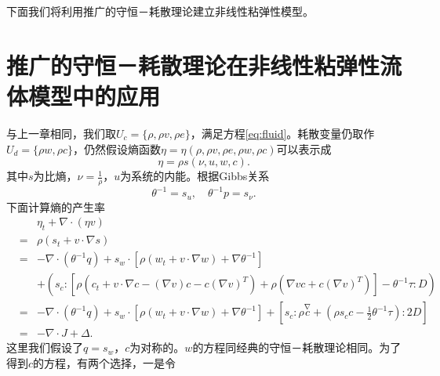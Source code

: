 

下面我们将利用推广的守恒－耗散理论建立非线性粘弹性模型。

\section{推广的守恒－耗散理论在非线性粘弹性流体模型中的应用}
与上一章相同，我们取$U_c = \{ \rho,\rho v,\rho e\}$，满足方程\eqref{eq:fluid}。耗散变量仍取作$U_d =\{\rho w, \rho c\}$，仍然假设熵函数$\eta =\eta(\rho,\rho v,\rho e,\rho w,\rho c)$可以表示成
\begin{equation*}
	\eta = \rho s(\nu,u,w,c).
\end{equation*}
其中$s$为比熵，$\nu = \frac{1}{\rho}$，$u$为系统的内能。根据Gibbs关系
\begin{equation*}
		\theta^{-1} = s_u, \quad \theta^{-1} p = s_{\nu}.
\end{equation*}
下面计算熵的产生率
\begin{eqnarray*}
		&&\eta_t + \nabla \cdot (\eta v) \\
		&=& \rho (s_t + v \cdot \nabla s) \\
		&=& -\nabla \cdot (\theta^{-1} q) + s_w \cdot [\rho (w_t + v \cdot \nabla w) + \nabla \theta^{-1}] \\
		&&+ (s_c:[\rho (c_t + v \cdot \nabla c - (\nabla v) c - c (\nabla v)^T) + \rho (\nabla v c + c (\nabla v)^T)] - \theta^{-1} \tau : D) \\
		&=& -\nabla \cdot (\theta^{-1} q) + s_w \cdot [\rho (w_t + v \cdot \nabla w) + \nabla \theta^{-1}] + [ s_c:\rho \stackrel{\nabla}{c} + (\rho s_c c - \frac{1}{2} \theta^{-1} \tau): 2 D]   \\
		&=& -\nabla \cdot J + \Delta.
	\end{eqnarray*}	
	这里我们假设了$q=s_w$，$c$为对称的。$w$的方程同经典的守恒－耗散理论相同。为了得到$c$的方程，有两个选择，一是令
